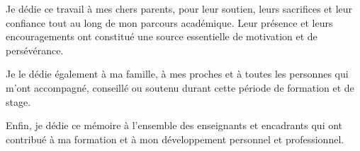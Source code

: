 {}
\thispagestyle{frontmatterstyle}


\begin{center}
\begin{minipage}{0.76\textwidth}
\centering
\itshape
\setlength{\parskip}{14pt}

Je dédie ce travail à mes chers parents, pour leur soutien, leurs sacrifices et leur confiance tout au long de mon parcours académique. Leur présence et leurs encouragements ont constitué une source essentielle de motivation et de persévérance.

Je le dédie également à ma famille, à mes proches et à toutes les personnes qui m’ont accompagné, conseillé ou soutenu durant cette période de formation et de stage.

Enfin, je dédie ce mémoire à l’ensemble des enseignants et encadrants qui ont contribué à ma formation et à mon développement personnel et professionnel.

\end{minipage}
\end{center}